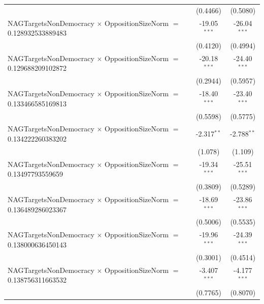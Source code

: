 \begin{tabular}{lcc}
                                                                                & (0.4466)             & (0.5080)\\   
   NAGTargetsNonDemocracy $\times$ OppositionSizeNorm $=$ 0.128932533889483     & -19.05$^{***}$       & -26.04$^{***}$\\   
                                                                                & (0.4120)             & (0.4994)\\   
   NAGTargetsNonDemocracy $\times$ OppositionSizeNorm $=$ 0.129688209102872     & -20.18$^{***}$       & -24.40$^{***}$\\   
                                                                                & (0.2944)             & (0.5957)\\   
   NAGTargetsNonDemocracy $\times$ OppositionSizeNorm $=$ 0.133466585169813     & -18.40$^{***}$       & -23.40$^{***}$\\   
                                                                                & (0.5598)             & (0.5775)\\   
   NAGTargetsNonDemocracy $\times$ OppositionSizeNorm $=$ 0.134222260383202     & -2.317$^{**}$        & -2.788$^{**}$\\   
                                                                                & (1.078)              & (1.109)\\   
   NAGTargetsNonDemocracy $\times$ OppositionSizeNorm $=$ 0.13497793559659      & -19.34$^{***}$       & -25.51$^{***}$\\   
                                                                                & (0.3809)             & (0.5289)\\   
   NAGTargetsNonDemocracy $\times$ OppositionSizeNorm $=$ 0.136489286023367     & -18.69$^{***}$       & -23.86$^{***}$\\   
                                                                                & (0.5006)             & (0.5535)\\   
   NAGTargetsNonDemocracy $\times$ OppositionSizeNorm $=$ 0.138000636450143     & -19.96$^{***}$       & -24.39$^{***}$\\   
                                                                                & (0.3001)             & (0.4514)\\   
   NAGTargetsNonDemocracy $\times$ OppositionSizeNorm $=$ 0.138756311663532     & -3.407$^{***}$       & -4.177$^{***}$\\   
                                                                                & (0.7765)             & (0.8070)\\   

\end{tabular}
